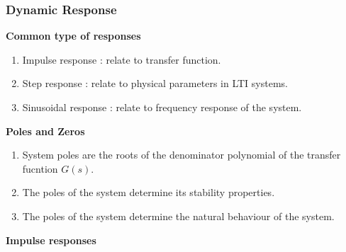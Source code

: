 \documentclass{article}
\begin{document}
\subsubsection{Dynamic Response}
\textbf{Common type of responses}
\begin{enumerate}
    \item Impulse response :  relate to transfer function.
    \item Step response : relate to physical parameters in LTI systems.
    \item Sinusoidal response : relate to frequency response of the system.
\end{enumerate}
\textbf{Poles and Zeros}
\begin{enumerate}
    \item System poles are the roots of the denominator polynomial of the transfer fucntion $G(s)$.
    \item The poles of the system determine its stability properties.
    \item The poles of the system determine the natural behaviour of the system.
\end{enumerate}
\textbf{Impulse responses}
\end{document}
